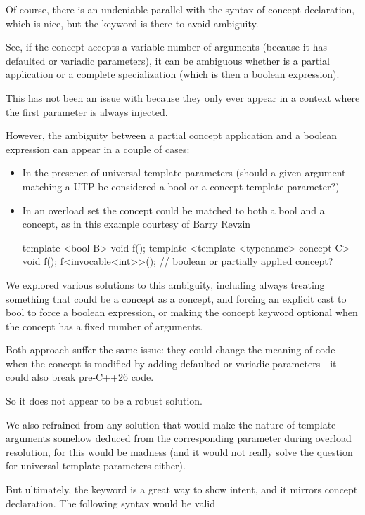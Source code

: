 \documentclass{wg21}
\begin{document}
Of course, there is an undeniable parallel with the syntax of concept declaration, which is nice, but the keyword is there to avoid ambiguity.

See, if the concept accepts a variable number of arguments (because it has defaulted or variadic parameters),
it can be ambiguous whether  is a partial application or a complete specialization
(which is then a boolean expression).

This has not been an issue with  because they only ever appear in a context where the first parameter is always injected.

However, the ambiguity between a partial concept application and a boolean expression can appear in a couple of cases:
\begin{itemize}
    \item In the presence of universal template parameters (should a given argument matching a UTP be considered a bool or a concept template parameter?)
    \item In an overload set the concept could be matched to both a bool and a concept, as in this example courtesy of Barry Revzin
\begin{colorblock}
template <bool B> void f();
template <template <typename> concept C> void f();
f<invocable<int>>(); // boolean or partially applied concept?
\end{colorblock}
\end{itemize}

We explored various solutions to this ambiguity, including always treating something that could be a concept as a concept,
and forcing an explicit cast to bool to force a boolean expression, or making the concept keyword optional when the concept has a fixed number of arguments.

Both approach suffer the same issue: they could change the meaning of code when the concept is modified by adding defaulted or variadic
parameters - it could also break pre-C++26 code.

So it does not appear to be a robust solution.

We also refrained from any solution that would make the nature of template arguments somehow deduced from the corresponding parameter
during overload resolution, for this would be madness (and it would not really solve the question for universal template parameters either).

But ultimately, the  keyword is a great way to show intent, and it mirrors concept declaration. The following syntax would be valid
\end{document}
